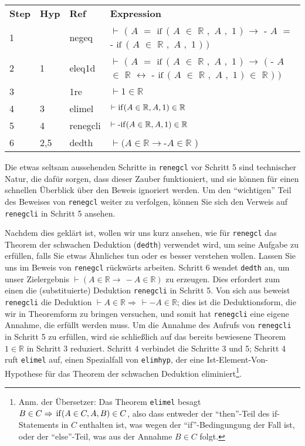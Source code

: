 \begin{longtabu} {l l l X}
\textbf{Step} & \textbf{Hyp} & \textbf{Ref} & \textbf{Expression} \\
  1 &  & negeq &
  $\vdash$ $($ $A$ $=$ ${\rm if}$ $($ $A$ $\in$ $\mathbb{R}$ $,$ $A$ $,$ $1$ $)$ $\rightarrow$
  $\textrm{-}$ $A$ $=$ $\textrm{-}$ ${\rm if}$ $($ $A$ $\in$ $\mathbb{R}$
  $,$ $A$ $,$ $1$ $)$ $)$ \\
 2 & 1 & eleq1d &
    $\vdash$ $($ $A$ $=$ ${\rm if}$ $($ $A$ $\in$ $\mathbb{R}$ $,$ $A$ $,$ $1$ $)$ $\rightarrow$ $($
    $\textrm{-}$ $A$ $\in$ $\mathbb{R}$ $\leftrightarrow$
    $\textrm{-}$ ${\rm if}$ $($ $A$ $\in$ $\mathbb{R}$ $,$ $A$ $,$ $1$ $)$ $\in$
    $\mathbb{R}$ $)$ $)$ \\
 3 &  & 1re & $\vdash 1 \in \mathbb{R}$ \\
 4 & 3 & elimel &
   $\vdash {\rm if} ( A \in \mathbb{R} , A , 1 ) \in \mathbb{R}$ \\
 5 & 4 & renegcli &
   $\vdash \textrm{-} {\rm if} ( A \in \mathbb{R} , A , 1 ) \in \mathbb{R}$ \\
 6 & 2,5 & dedth &
   $\vdash ( A \in \mathbb{R} \rightarrow \textrm{-} A \in \mathbb{R}$ ) \\
\end{longtabu}

Die etwas seltsam aussehenden Schritte in \texttt{renegcl} vor Schritt 5 sind technischer Natur, die dafür sorgen, dass dieser Zauber funktioniert, und sie können für einen schnellen Überblick über den Beweis ignoriert werden. Um den "`wichtigen"' Teil des Beweises von \texttt{renegcl} weiter zu verfolgen, können Sie sich den Verweis auf \texttt{renegcli} in Schritt 5 ansehen.

Nachdem dies geklärt ist, wollen wir uns kurz ansehen, wie für \texttt{renegcl} das Theorem der schwachen Deduktion (\texttt{dedth}) verwendet wird, um seine Aufgabe zu erfüllen, falls Sie etwas Ähnliches tun oder es besser verstehen wollen. Lassen Sie uns im Beweis von \texttt{renegcl} rückwärts arbeiten. Schritt 6 wendet \texttt{dedth} an, um unser Zielergebnis $ \vdash ( A \in \mathbb{R} \rightarrow\, - A \in \mathbb{R} )$ zu erzeugen. Dies erfordert zum einen die (substituierte) Deduktion \texttt{renegcli} in Schritt 5. Von sich aus beweist \texttt{renegcli} die Deduktion $ \vdash A \in \mathbb{R} \Rightarrow\, \vdash - A \in \mathbb{R}$; dies ist die Deduktionsform, die wir in Theoremform zu bringen versuchen, und somit hat \texttt{renegcli} eine eigene Annahme, die erfüllt werden muss. Um die Annahme des Aufrufs von \texttt{renegcli} in Schritt 5 zu erfüllen, wird sie schließlich auf das bereits bewiesene Theorem $1 \in \mathbb{R}$ in Schritt 3 reduziert. Schritt 4 verbindet die Schritte 3 und 5; Schritt 4 ruft \texttt{elimel} auf, einen Spezialfall von \texttt{elimhyp}, der eine Ist-Element-Von-Hypothese für das Theorem der schwachen Deduktion eliminiert\footnote{Anm. der Übersetzer: Das Theorem \texttt{elimel} besagt $ B \in C \Rightarrow\, {\rm if} ( A \in C , A , B ) \in C $, also dass entweder der "`then"'-Teil des if-Statements in $ C $ enthalten ist, was wegen der "`if"'-Bedingungung der Fall ist, oder der "`else"'-Teil, was aus der Annahme $ B \in C $ folgt.}.

